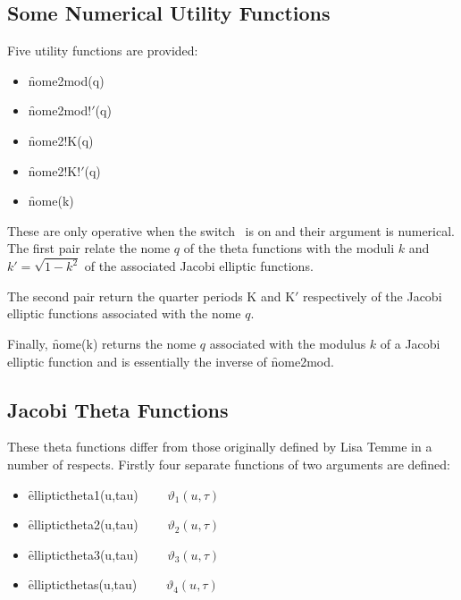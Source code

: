 \subsection{Some Numerical Utility Functions}
\hypertarget{operator:NOME}{}
\hypertarget{operator:NOME2K}{}
\hypertarget{operator:NOME2K'}{}
\hypertarget{operator:NOME2MOD}{}
\hypertarget{operator:NOME2MOD'}{}
\hypertarget{ELLIPNOME}{}

Five utility functions are provided:
\begin{itemize}
\item \f{nome2mod(q)}
\item \f{nome2mod!$'$(q)}
\item \f{nome2!K(q)}
\item \f{nome2!K!$'$(q)}
\item \f{nome(k)}
\end{itemize}

These are only operative when the switch \ is on and their
argument is numerical. The first pair relate the nome $q$ of the theta
functions with the moduli $k$ and $k'=\sqrt{1-k^2}$ of the associated Jacobi
elliptic functions.

The second pair return the quarter periods K and K$'$ respectively of
the Jacobi elliptic functions associated with the nome $q$.

Finally, \f{nome(k)} returns the nome $q$ associated with the modulus $k$ of
a Jacobi elliptic function and is essentially the inverse of \f{nome2mod}.

\subsection{Jacobi Theta Functions}
\hypertarget{JACTF}{}
These theta functions differ from those originally defined by Lisa Temme
in a number of respects.
Firstly four separate functions of two arguments are defined:
\hypertarget{operator:ELLIPTICTHETA1}{}
\hypertarget{operator:ELLIPTICTHETA2}{}
\hypertarget{operator:ELLIPTICTHETA3}{}
\hypertarget{operator:ELLIPTICTHETA4}{}
 
 
\begin{itemize}
\item \f{elliptictheta1(u,tau)} $\qquad \vartheta_1(u, \tau)$
\item \f{elliptictheta2(u,tau)} $\qquad \vartheta_2(u, \tau)$
\item \f{elliptictheta3(u,tau)} $\qquad \vartheta_3(u, \tau)$
\item \f{ellipticthetas(u,tau)} $\qquad \vartheta_4(u, \tau)$
\end{itemize}

